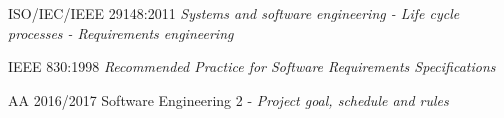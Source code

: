 \begin{thebibliography}{9}

	ISO/IEC/IEEE 29148:2011 \emph{Systems and software engineering - Life cycle processes - Requirements engineering}

	IEEE 830:1998 \emph{Recommended Practice for Software Requirements Specifications}
	
	AA 2016/2017 Software Engineering 2 - \emph{Project goal, schedule and rules}

\end{thebibliography}